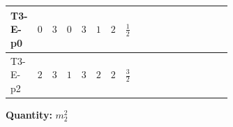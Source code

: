 \documentclass[8pt]{article}
\begin{document}
\begin{landscape}
\begin{longtable}{@{}llcccccc >{\raggedright\arraybackslash}p{0.21\linewidth} >{\raggedright\arraybackslash}p{0.21\linewidth} >{\raggedright\arraybackslash}p{0.21\linewidth}@{}}
\midrule
T3-E-p0 & $0$ & $3$ & $0$ & $3$ & $1$ & $2$ & $\frac{1}{2}$ & \scriptsize\adjustbox{max width=\linewidth}{$\begin{gathered} {m_2^2} (2 T_{\nu}^{(2)}+8 {\lambda_{S_2}^{(1)}}+4 {\lambda_{S_2}^{(A)}})\end{gathered}$} & \scriptsize\adjustbox{max width=\linewidth}{$\begin{gathered} -4 \operatorname{Tr}\!\left({M_F}\,\left({y_2}\right)^{\dagger}\,{y_2}\,\left({M_F}\right)^{\dagger}\right)\end{gathered}$} & \scriptsize\adjustbox{max width=\linewidth}{$\begin{gathered} -12 {g_2}^2 {m_2^2}\end{gathered}$} \\
\midrule
T3-E-p2 & $2$ & $3$ & $1$ & $3$ & $2$ & $2$ & $\frac{3}{2}$ & \scriptsize\adjustbox{max width=\linewidth}{$\begin{gathered} {m_2^2} (2 T_{\nu}^{(2)}+8 {\lambda_{S_2}^{(1)}}+4 {\lambda_{S_2}^{(A)}})\end{gathered}$} & \scriptsize\adjustbox{max width=\linewidth}{$\begin{gathered} -4 \operatorname{Tr}\!\left({M_F}\,\left({y_2}\right)^{\dagger}\,{y_2}\,\left({M_F}\right)^{\dagger}\right)\end{gathered}$} & \scriptsize\adjustbox{max width=\linewidth}{$\begin{gathered} -12 {g_2}^2 {m_2^2}\end{gathered}$} \\
\midrule
\bottomrule
\end{longtable}
\clearpage
\noindent\textbf{Quantity: }$m_2^2$\par\smallskip

\end{landscape}
\end{document}
